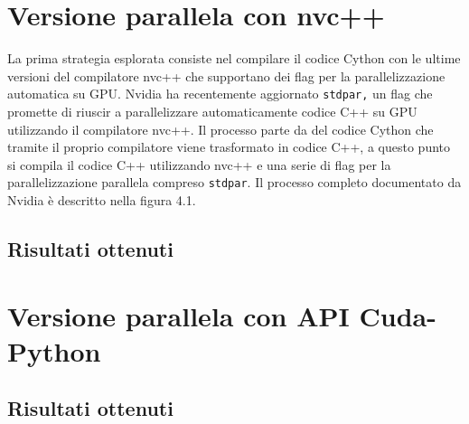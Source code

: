 \documentclass[12pt,a4paper]{report}
\begin{document}
\chapter{Versione parallela con nvc++} 
La prima strategia esplorata consiste nel compilare il codice Cython con le ultime versioni del compilatore nvc++ che supportano dei flag per la parallelizzazione automatica su GPU.  Nvidia ha recentemente aggiornato \verb|stdpar,|  un flag che promette di riuscir a parallelizzare automaticamente codice C++ su GPU utilizzando il compilatore nvc++. \newline
Il processo parte da del codice Cython che tramite il proprio compilatore viene trasformato in codice C++,  a questo punto si compila il codice C++ utilizzando nvc++ e una serie di flag per la parallelizzazione parallela compreso \verb|stdpar|. \newline
Il processo completo documentato da Nvidia è descritto nella figura 4.1.
\begin{figure}[H]
\centering
\begin{floatrow}[1]
\end{floatrow}
\end{figure}

\section{Risultati ottenuti}
 

\chapter{Versione parallela con API Cuda-Python} 
\section{Risultati ottenuti}
\end{document}

